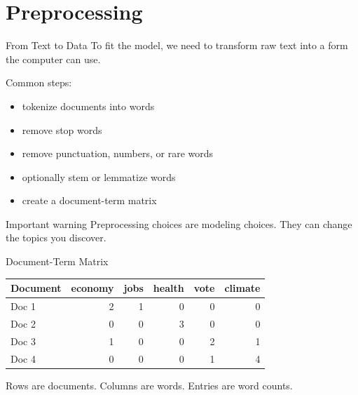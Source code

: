 \documentclass[aspectratio=169]{beamer}
\begin{document}
\section{Preprocessing}

\begin{frame}{From Text to Data}
To fit the model, we need to transform raw text into a form the computer can use.

\vspace{0.2cm}
Common steps:
\begin{itemize}
  \item tokenize documents into words
  \item remove stop words
  \item remove punctuation, numbers, or rare words
  \item optionally stem or lemmatize words
  \item create a document-term matrix
\end{itemize}

\vspace{0.3cm}
\begin{block}{Important warning}
Preprocessing choices are modeling choices. They can change the topics you discover.
\end{block}
\end{frame}

\begin{frame}{Document-Term Matrix}
\begin{center}
\begin{tabular}{lrrrrr}
\toprule
Document & economy & jobs & health & vote & climate \\
\midrule
Doc 1 & 2 & 1 & 0 & 0 & 0 \\
Doc 2 & 0 & 0 & 3 & 0 & 0 \\
Doc 3 & 1 & 0 & 0 & 2 & 1 \\
Doc 4 & 0 & 0 & 0 & 1 & 4 \\
\bottomrule
\end{tabular}
\end{center}

\vspace{0.4cm}
Rows are documents. Columns are words. Entries are word counts.
\end{frame}
\end{document}
